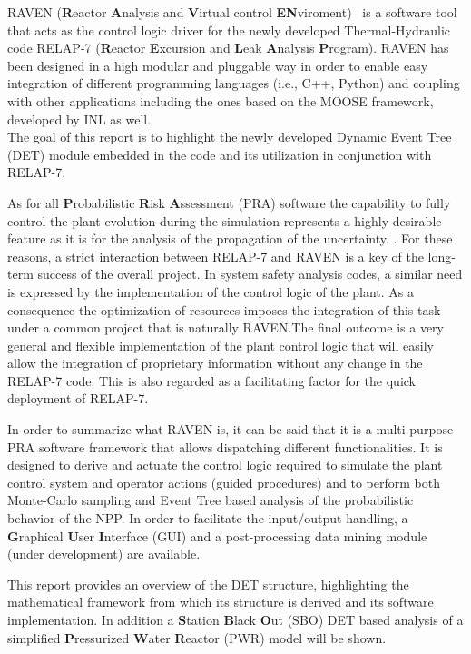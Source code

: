 \label{sec:introduction}
RAVEN (\textbf{R}eactor \textbf{A}nalysis and \textbf{V}irtual control \textbf{EN}viroment)~\cite{ravenFY12,mandelliANS2012} is a software tool that acts as the control logic driver for the newly developed Thermal-Hydraulic code RELAP-7  (\textbf{R}eactor \textbf{E}xcursion and \textbf{L}eak \textbf{A}nalysis \textbf{P}rogram). 
RAVEN has been designed in a high modular and pluggable way in order to enable easy integration of different programming languages (i.e., C++, Python) and coupling with other applications including the ones based on the MOOSE framework, developed by INL as well.
\\The goal of this report is to highlight the newly developed  Dynamic Event Tree (DET) module embedded in the code and its utilization in conjunction with RELAP-7. 

As for all \textbf{P}robabilistic \textbf{R}isk \textbf{A}ssessment (PRA) software the capability to fully control the plant evolution during the simulation represents a highly desirable feature as it is for the analysis of the propagation of the uncertainty. . For these reasons, a strict interaction between RELAP-7 and RAVEN is a key of the long-term success of the overall project. In system safety analysis codes, a similar need is expressed by the implementation of the control logic of the plant. As a consequence the optimization of resources imposes the integration of this task under a common project that is naturally RAVEN.The final outcome is a very general and flexible implementation of the plant control logic that will easily allow the integration of proprietary information without any change in the RELAP-7 code. This is also regarded as a facilitating factor for the quick deployment of RELAP-7.

In order to summarize what RAVEN is, it can be said that it is a multi-purpose PRA software framework that allows dispatching different functionalities. 
It is designed to derive and actuate the control logic required to simulate the plant control system and operator actions (guided procedures) and to perform both Monte-Carlo sampling  and Event Tree based analysis of the probabilistic behavior of the NPP. 
In order to facilitate the input/output handling, a \textbf{G}raphical \textbf{U}ser \textbf{I}nterface (GUI) and a post-processing data mining module (under development) are available.

This report provides an overview of the DET structure, highlighting the mathematical framework from which its structure is derived and its software implementation. In addition a \textbf{S}tation \textbf{B}lack \textbf{O}ut (SBO) DET based analysis of a simplified \textbf{P}ressurized \textbf{W}ater \textbf{R}eactor (PWR) model will be shown.
\vspace{-5mm}



